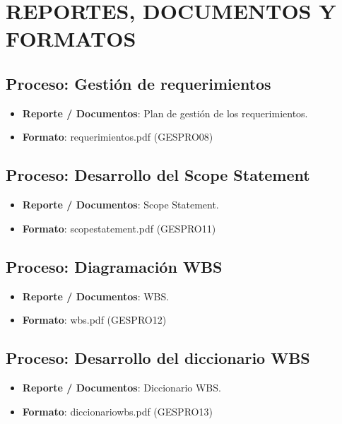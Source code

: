 \chapter{REPORTES, DOCUMENTOS Y FORMATOS}
%
\section{Proceso: Gesti\'on de requerimientos}
%
\begin{itemize}
	\item \textbf{Reporte / Documentos}: Plan de gesti\'on de los requerimientos.
	\item \textbf{Formato}: requerimientos.pdf (GESPRO08)
\end{itemize}
%
%
\section{Proceso: Desarrollo del Scope Statement}
%
\begin{itemize}
	\item \textbf{Reporte / Documentos}: Scope Statement.
	\item \textbf{Formato}: scopestatement.pdf (GESPRO11)
\end{itemize}
%
\section{Proceso: Diagramaci\'on WBS}
%
\begin{itemize}
	\item \textbf{Reporte / Documentos}: WBS.
	\item \textbf{Formato}: wbs.pdf (GESPRO12)
\end{itemize}
%
\section{Proceso: Desarrollo del diccionario WBS}
%
\begin{itemize}
	\item \textbf{Reporte / Documentos}: Diccionario WBS.
	\item \textbf{Formato}: diccionariowbs.pdf (GESPRO13)
\end{itemize}